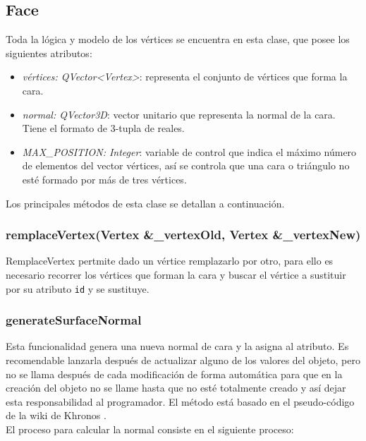 \subsection{ Face}
Toda la lógica y modelo de los vértices se encuentra en esta clase, que posee los siguientes atributos:

\begin{itemize}
	\item \textit{vértices: QVector<Vertex>}: representa el conjunto de vértices que forma la cara.
	\item \textit{normal: QVector3D}: vector unitario que representa la normal de la cara. Tiene el formato de 3-tupla de reales.
	\item \textit{MAX\_POSITION: Integer}: variable de control que indica el máximo número de elementos del vector vértices, así se controla que una cara o triángulo no esté formado por más de tres vértices.
\end{itemize}

Los principales métodos de esta clase se detallan a continuación.

\subsubsection*{remplaceVertex(Vertex \&\_vertexOld, Vertex \&\_vertexNew)}

RemplaceVertex pertmite dado un vértice remplazarlo por otro, para ello es necesario recorrer los vértices que forman la cara y buscar el vértice a sustituir por su atributo \texttt{id} y se sustituye.

\subsubsection*{generateSurfaceNormal}
Esta funcionalidad genera una nueva normal de cara y la asigna al atributo. Es recomendable lanzarla después de actualizar alguno de los valores del objeto, pero no se llama después de cada modificación de forma automática para que en la creación del objeto no se llame hasta que no esté totalmente creado y así dejar esta responsabilidad al programador. El método está basado en el pseudo-código de la wiki de Khronos \cite{CalculatingSurfaceNormal}.\\

El proceso para calcular la normal consiste en el siguiente proceso:\\

